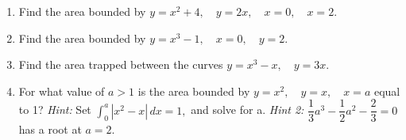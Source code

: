 \documentclass[12pt]{article}
\begin{document}
\begin{enumerate}

\item Find the area bounded by $y=x^2+4,\quad y=2x, \quad x=0, \quad x=2.$
\vfill
\pagebreak
\item Find the area bounded by $y=x^3-1, \quad x=0, \quad y=2.$
\vfill
\pagebreak

\item Find the area trapped between the curves $y=x^3-x,\quad y=3x.$
\vfill 
\pagebreak
\item For what value of $a > 1$ is the area bounded by $y=x^2, \quad y=x, \quad x=a$ equal to 1? \emph{Hint:} Set $\displaystyle\int_0^a |x^2-x|\, dx = 1,$ and solve for a. \emph{Hint 2:} $\dfrac{1}{3}a^3-\dfrac{1}{2}a^2-\dfrac{2}{3}=0$ has a root at $a=2.$
\vfill 
\end{enumerate}
\end{document}
